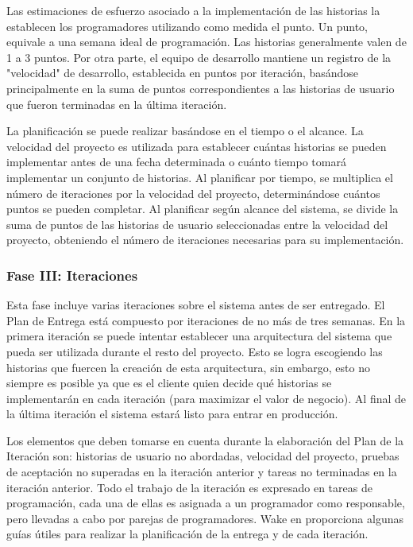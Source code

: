 	Las estimaciones de esfuerzo asociado a la implementación de las historias la establecen los programadores utilizando como medida el punto. Un punto, equivale a una semana ideal de programación. Las historias generalmente valen de 1 a 3 puntos. Por otra parte, el equipo de desarrollo mantiene un registro de la "velocidad" de desarrollo, establecida en puntos por iteración, basándose principalmente en la suma de puntos correspondientes a las historias de usuario que fueron terminadas en la última iteración.

	La planificación se puede realizar basándose en el tiempo o el alcance. La velocidad del proyecto es utilizada para establecer cuántas historias se pueden implementar antes de una fecha determinada o cuánto tiempo tomará implementar un conjunto de historias. Al planificar por tiempo, se multiplica el número de iteraciones por la velocidad del proyecto, determinándose cuántos puntos se pueden completar. Al planificar según alcance del sistema, se divide la suma de puntos de las historias de usuario seleccionadas entre la velocidad del proyecto, obteniendo el número de iteraciones necesarias para su implementación.	

\setlength{\parskip}{0mm}

\subsubsection{Fase III: Iteraciones}
\setlength{\parskip}{5mm}

	Esta fase incluye varias iteraciones sobre el sistema antes de ser entregado. El Plan de Entrega está compuesto por iteraciones de no más de tres semanas. En la primera iteración se puede intentar establecer una arquitectura del sistema que pueda ser utilizada durante el resto del proyecto. Esto se logra escogiendo las historias que fuercen la creación de esta arquitectura, sin embargo, esto no siempre es posible ya que es el cliente quien decide qué historias se implementarán en cada iteración (para maximizar el valor de negocio). Al final de la última iteración el sistema estará listo para entrar en producción.

	Los elementos que deben tomarse en cuenta durante la elaboración del Plan de la Iteración son: historias de usuario no abordadas, velocidad del proyecto, pruebas de aceptación no superadas en la iteración anterior y tareas no terminadas en la iteración anterior. Todo el trabajo de la iteración es expresado en tareas de programación, cada una de ellas es asignada a un programador como responsable, pero llevadas a cabo por parejas de programadores. Wake en proporciona algunas guías útiles para realizar la planificación de la entrega y de cada iteración.


